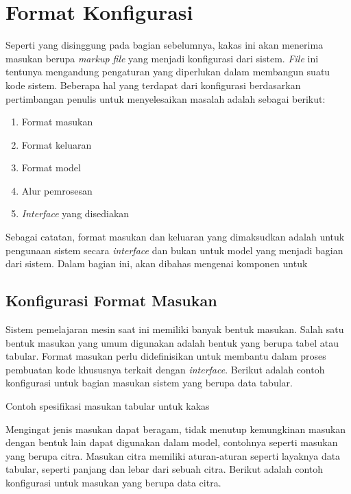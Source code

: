 \section{Format Konfigurasi}

Seperti yang disinggung pada bagian sebelumnya, kakas ini akan menerima masukan berupa \textit{markup file} yang menjadi konfigurasi dari sistem.
\textit{File} ini tentunya mengandung pengaturan yang diperlukan dalam membangun suatu kode sistem.
Beberapa hal yang terdapat dari konfigurasi berdasarkan pertimbangan penulis untuk menyelesaikan masalah adalah sebagai berikut:

\begin{enumerate}
	\item Format masukan
	\item Format keluaran
	\item Format model
	\item Alur pemrosesan
	\item \textit{Interface} yang disediakan
\end{enumerate}

Sebagai catatan, format masukan dan keluaran yang dimaksudkan adalah untuk pengunaan sistem secara \textit{interface} dan bukan untuk model yang menjadi bagian dari sistem.
Dalam bagian ini, akan dibahas mengenai komponen untuk 

\subsection{Konfigurasi Format Masukan}\label{section:03-input-format}

Sistem pemelajaran mesin saat ini memiliki banyak bentuk masukan.
Salah satu bentuk masukan yang umum digunakan adalah bentuk yang berupa tabel atau tabular.
Format masukan perlu didefinisikan untuk membantu dalam proses pembuatan kode khususnya terkait dengan \textit{interface}.
Berikut adalah contoh konfigurasi untuk bagian masukan sistem yang berupa data tabular.

\begin{listing}[H]
	\caption{Contoh spesifikasi masukan tabular untuk kakas}
	\label{listing:1}
\end{listing}

Mengingat jenis masukan dapat beragam, tidak menutup kemungkinan masukan dengan bentuk lain dapat digunakan dalam model, contohnya seperti masukan yang berupa citra.
Masukan citra memiliki aturan-aturan seperti layaknya data tabular, seperti panjang dan lebar dari sebuah citra.
Berikut adalah contoh konfigurasi untuk masukan yang berupa data citra.


